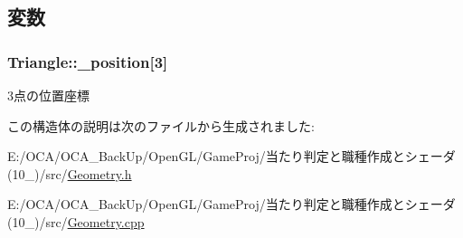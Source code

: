 \subsection{変数}
\hypertarget{struct_triangle_a2138d57a641e85b40dfb79dbbb14f733}{
\subsubsection[{\-\_\-position}]{ Triangle\-::\-\_\-position\mbox{[}3\mbox{]}}}\label{struct_triangle_a2138d57a641e85b40dfb79dbbb14f733}


3点の位置座標 



この構造体の説明は次のファイルから生成されました\-:\begin{DoxyCompactItemize}
\item 
E\-:/\-O\-C\-A/\-O\-C\-A\-\_\-\-Back\-Up/\-Open\-G\-L/\-Game\-Proj/当たり判定と職種作成とシェーダ(10\-\_)/src/\hyperlink{_geometry_8h}{Geometry.\-h}\item 
E\-:/\-O\-C\-A/\-O\-C\-A\-\_\-\-Back\-Up/\-Open\-G\-L/\-Game\-Proj/当たり判定と職種作成とシェーダ(10\-\_)/src/\hyperlink{_geometry_8cpp}{Geometry.\-cpp}\end{DoxyCompactItemize}
